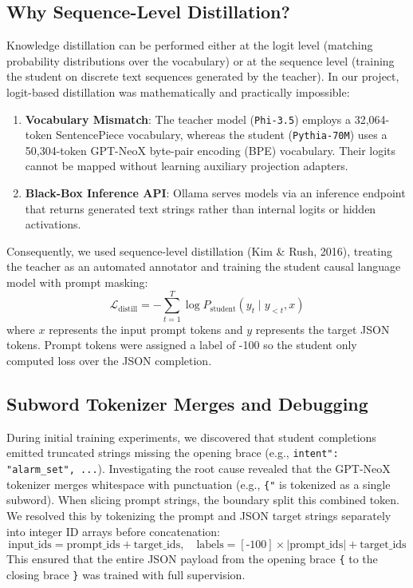\documentclass[10pt,a4paper]{article}
\begin{document}
\subsection{Why Sequence-Level Distillation?}
Knowledge distillation can be performed either at the logit level (matching probability distributions over the vocabulary) or at the sequence level (training the student on discrete text sequences generated by the teacher). In our project, logit-based distillation was mathematically and practically impossible:
\begin{enumerate}
    \item \textbf{Vocabulary Mismatch}: The teacher model (\texttt{Phi-3.5}) employs a 32,064-token SentencePiece vocabulary, whereas the student (\texttt{Pythia-70M}) uses a 50,304-token GPT-NeoX byte-pair encoding (BPE) vocabulary. Their logits cannot be mapped without learning auxiliary projection adapters.
    \item \textbf{Black-Box Inference API}: Ollama serves models via an inference endpoint that returns generated text strings rather than internal logits or hidden activations.
\end{enumerate}
Consequently, we used sequence-level distillation (Kim \& Rush, 2016), treating the teacher as an automated annotator and training the student causal language model with prompt masking:
$$\mathcal{L}_{\text{distill}} = -\sum_{t=1}^{T} \log P_{\text{student}}\left(y_t \mid y_{<t}, x\right)$$
where $x$ represents the input prompt tokens and $y$ represents the target JSON tokens. Prompt tokens were assigned a label of -100 so the student only computed loss over the JSON completion.

\subsection{Subword Tokenizer Merges and Debugging}
During initial training experiments, we discovered that student completions emitted truncated strings missing the opening brace (e.g., \texttt{intent": "alarm\_set", ...}). Investigating the root cause revealed that the GPT-NeoX tokenizer merges whitespace with punctuation (e.g., \texttt{\textvisiblespace\{"} is tokenized as a single subword). When slicing prompt strings, the boundary split this combined token. We resolved this by tokenizing the prompt and JSON target strings separately into integer ID arrays before concatenation:
$$\text{input\_ids} = \text{prompt\_ids} + \text{target\_ids}, \quad \text{labels} = [\text{-}100] \times |\text{prompt\_ids}| + \text{target\_ids}$$
This ensured that the entire JSON payload from the opening brace \texttt{\{} to the closing brace \texttt{\}} was trained with full supervision.
\end{document}
